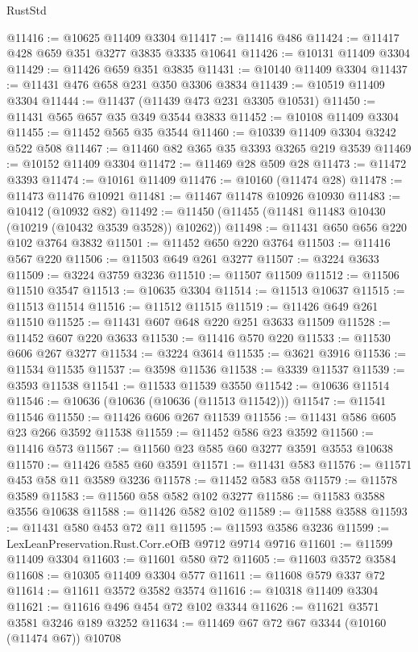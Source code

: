 \begin{lexlean}{RustStd}
\begin{coremodule}
@11416 := @10625 @11409 @3304
@11417 := @11416 @486
@11424 := @11417 @428 @659 @351 @3277 @3835 @3335 @10641
@11426 := @10131 @11409 @3304
@11429 := @11426 @659 @351 @3835
@11431 := @10140 @11409 @3304
@11437 := @11431 @476 @658 @231 @350 @3306 @3834
@11439 := @10519 @11409 @3304
@11444 := @11437 (@11439 @473 @231 @3305 @10531)
@11450 := @11431 @565 @657 @35 @349 @3544 @3833
@11452 := @10108 @11409 @3304
@11455 := @11452 @565 @35 @3544
@11460 := @10339 @11409 @3304 @3242 @522 @508
@11467 := @11460 @82 @365 @35 @3393 @3265 @219 @3539
@11469 := @10152 @11409 @3304
@11472 := @11469 @28 @509 @28
@11473 := @11472 @3393
@11474 := @10161 @11409
@11476 := @10160 (@11474 @28)
@11478 := @11473 @11476 @10921
@11481 := @11467 @11478 @10926 @10930
@11483 := @10412 (@10932 @82)
@11492 := @11450 (@11455 (@11481 @11483 @10430 (@10219 (@10432 @3539 @3528)) @10262))
@11498 := @11431 @650 @656 @220 @102 @3764 @3832
@11501 := @11452 @650 @220 @3764
@11503 := @11416 @567 @220
@11506 := @11503 @649 @261 @3277
@11507 := @3224 @3633
@11509 := @3224 @3759 @3236
@11510 := @11507 @11509
@11512 := @11506 @11510 @3547
@11513 := @10635 @3304
@11514 := @11513 @10637
@11515 := @11513 @11514
@11516 := @11512 @11515
@11519 := @11426 @649 @261 @11510
@11525 := @11431 @607 @648 @220 @251 @3633 @11509
@11528 := @11452 @607 @220 @3633
@11530 := @11416 @570 @220
@11533 := @11530 @606 @267 @3277
@11534 := @3224 @3614
@11535 := @3621 @3916
@11536 := @11534 @11535
@11537 := @3598 @11536
@11538 := @3339 @11537
@11539 := @3593 @11538
@11541 := @11533 @11539 @3550
@11542 := @10636 @11514
@11546 := @10636 (@10636 (@10636 (@11513 @11542)))
@11547 := @11541 @11546
@11550 := @11426 @606 @267 @11539
@11556 := @11431 @586 @605 @23 @266 @3592 @11538
@11559 := @11452 @586 @23 @3592
@11560 := @11416 @573
@11567 := @11560 @23 @585 @60 @3277 @3591 @3553 @10638
@11570 := @11426 @585 @60 @3591
@11571 := @11431 @583
@11576 := @11571 @453 @58 @11 @3589 @3236
@11578 := @11452 @583 @58
@11579 := @11578 @3589
@11583 := @11560 @58 @582 @102 @3277
@11586 := @11583 @3588 @3556 @10638
@11588 := @11426 @582 @102
@11589 := @11588 @3588
@11593 := @11431 @580 @453 @72 @11
@11595 := @11593 @3586 @3236
@11599 := LexLeanPreservation.Rust.Corr.eOfB @9712 @9714 @9716
@11601 := @11599 @11409 @3304
@11603 := @11601 @580 @72
@11605 := @11603 @3572 @3584
@11608 := @10305 @11409 @3304 @577
@11611 := @11608 @579 @337 @72
@11614 := @11611 @3572 @3582 @3574
@11616 := @10318 @11409 @3304
@11621 := @11616 @496 @454 @72 @102 @3344
@11626 := @11621 @3571 @3581 @3246 @189 @3252
@11634 := @11469 @67 @72 @67 @3344 (@10160 (@11474 @67)) @10708

\end{coremodule}
\end{lexlean}
